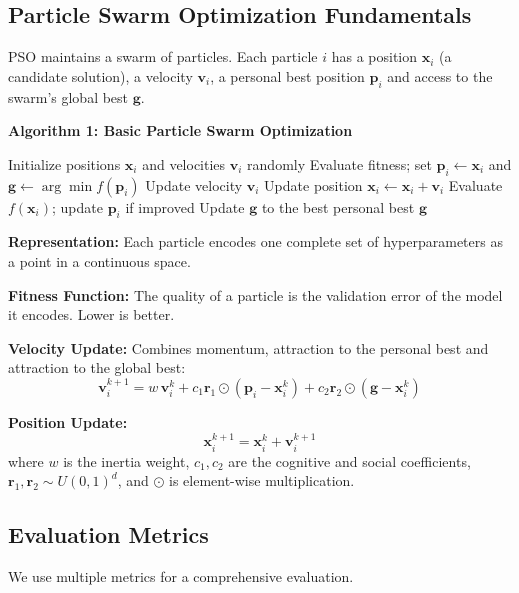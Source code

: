 \subsection{Particle Swarm Optimization Fundamentals}
PSO \cite{kennedy1995} maintains a swarm of particles. Each particle $i$ has a position $\mathbf{x}_i$ (a candidate solution), a velocity $\mathbf{v}_i$, a personal best position $\mathbf{p}_i$ and access to the swarm's global best $\mathbf{g}$.

\noindent\textbf{Algorithm 1: Basic Particle Swarm Optimization}
\begin{algorithmic}
\State Initialize positions $\mathbf{x}_i$ and velocities $\mathbf{v}_i$ randomly
\State Evaluate fitness; set $\mathbf{p}_i \gets \mathbf{x}_i$ and $\mathbf{g} \gets \arg\min f(\mathbf{p}_i)$
    \State Update velocity $\mathbf{v}_i$
    \State Update position $\mathbf{x}_i \gets \mathbf{x}_i + \mathbf{v}_i$
    \State Evaluate $f(\mathbf{x}_i)$; update $\mathbf{p}_i$ if improved
  \EndFor
  \State Update $\mathbf{g}$ to the best personal best
\EndFor
\State \Return $\mathbf{g}$
\end{algorithmic}

\noindent\textbf{Representation:} Each particle encodes one complete set of hyperparameters as a point in a continuous space.

\noindent\textbf{Fitness Function:} The quality of a particle is the validation error of the model it encodes. Lower is better.

\noindent\textbf{Velocity Update:} Combines momentum, attraction to the personal best and attraction to the global best:
\begin{equation}
\mathbf{v}_i^{k+1} = w\,\mathbf{v}_i^{k} + c_1 \mathbf{r}_1 \odot (\mathbf{p}_i - \mathbf{x}_i^{k}) + c_2 \mathbf{r}_2 \odot (\mathbf{g} - \mathbf{x}_i^{k})
\end{equation}

\noindent\textbf{Position Update:}
\begin{equation}
\mathbf{x}_i^{k+1} = \mathbf{x}_i^{k} + \mathbf{v}_i^{k+1}
\end{equation}
where $w$ is the inertia weight, $c_1, c_2$ are the cognitive and social coefficients, $\mathbf{r}_1, \mathbf{r}_2 \sim U(0,1)^d$, and $\odot$ is element-wise multiplication.

\subsection{Evaluation Metrics}
We use multiple metrics for a comprehensive evaluation.

